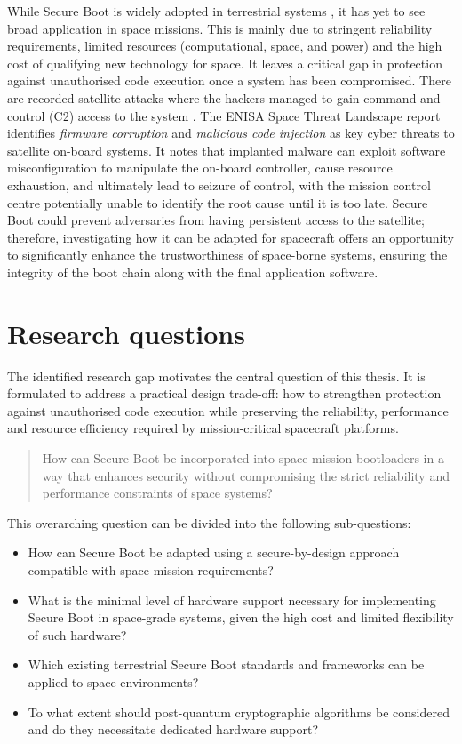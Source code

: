 While Secure Boot is widely adopted in terrestrial systems \cite{Secure_Boot_Fuzz_2025}, it has yet to see broad application in space missions. This is mainly due to stringent reliability requirements, limited resources (computational, space, and power) and the high cost of qualifying new technology for space. It leaves a critical gap in protection against unauthorised code execution once a system has been compromised. There are recorded satellite attacks where the hackers managed to gain command-and-control (C2) access to the system \cite{us_china_security_review}. The ENISA Space Threat Landscape report \cite{enisa_2025} identifies \emph{firmware corruption} and \emph{malicious code injection} as key cyber threats to satellite on-board systems. It notes that implanted malware can exploit software misconfiguration to manipulate the on-board controller, cause resource exhaustion, and ultimately lead to seizure of control, with the mission control centre potentially unable to identify the root cause until it is too late. Secure Boot could prevent adversaries from having persistent access to the satellite; therefore, investigating how it can be adapted for spacecraft offers an opportunity to significantly enhance the trustworthiness of space-borne systems, ensuring the integrity of the boot chain along with the final application software.

\section{Research questions}
\label{section:intro-rq}

The identified research gap motivates the central question of this thesis. It is formulated to address a practical design trade-off: how to strengthen protection against unauthorised code execution while preserving the reliability, performance and resource efficiency required by mission-critical spacecraft platforms.

\begin{quote}
How can Secure Boot be incorporated into space mission bootloaders in a way that enhances security without compromising the strict reliability and performance constraints of space systems?
\end{quote}

This overarching question can be divided into the following sub-questions:

\begin{itemize}
    \item How can Secure Boot be adapted using a secure-by-design approach compatible with space mission requirements?
    \item What is the minimal level of hardware support necessary for implementing Secure Boot in space-grade systems, given the high cost and limited flexibility of such hardware?
    \item Which existing terrestrial Secure Boot standards and frameworks can be applied to space environments?
    \item To what extent should post-quantum cryptographic algorithms be considered and do they necessitate dedicated hardware support?
\end{itemize}

